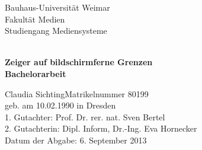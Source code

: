 \begin{titlepage}

\begin{center}



\Large
\begin{flushleft}
    Bauhaus-Universität Weimar\\
    Fakultät Medien\\
    Studiengang Mediensysteme\\
\end{flushleft}

\textsc{\LARGE }\\[2.5cm]


\huge{ \bfseries{Zeiger auf bildschirmferne Grenzen}}\\[2.0cm]

\huge{ \bfseries{Bachelorarbeit}}\\[3.0cm]

\end{center}

\Large
Claudia Sichting\hspace{5cm}Matrikelnummer 80199\\
geb. am 10.02.1990 in Dresden\\[1.5cm]
1. Gutachter: Prof. Dr. rer. nat. Sven Bertel\\
2. Gutachterin: Dipl. Inform, Dr.-Ing. Eva Hornecker\\[1.0cm]

Datum der Abgabe: 6. September 2013




\end{titlepage}